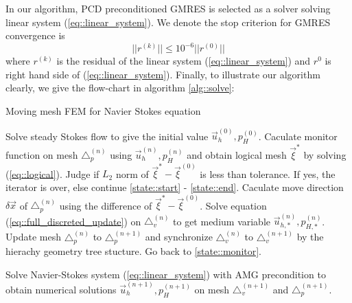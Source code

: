 \documentclass{eajam}
\begin{document}
   In our algorithm, PCD preconditioned GMRES is selected as a solver
   solving linear system (\ref{eq::linear_system}). We denote the stop
   criterion for GMRES convergence is 
   \begin{equation}
     ||r^{(k)}||  \leq 10^{-6} ||r^{(0)}||
   \end{equation}
   where $r^{(k)}$ is the residual of the linear system
   (\ref{eq::linear_system}) and $r^{0}$ is right hand side of
   (\ref{eq::linear_system}). Finally, to illustrate our algorithm
   clearly, we give the flow-chart in algorithm \ref{alg::solve}:
   \begin{algorithm}
     \caption{Moving mesh FEM for Navier Stokes equation}
     \begin{algorithmic}[1]
       \State Solve steady Stokes flow to give the initial
       value $\vec{u}_h^{(0)}, p_H^{(0)}$.
       \State Caculate monitor function on mesh $\triangle_p^{(n)}$
       using $\vec{u}_h^{(n)}, p_H^{(n)}$ and obtain
       logical mesh $\vec{\xi}^*$ by solving
       (\ref{eq::logical}). \label{state::monitor}
       \State Judge if $L_2$ norm of $\vec{\xi}^* -
       \vec{\xi}^{(0)}$ is less than tolerance. If yes,
       the iterator is over, else continue
       \ref{state::start} - \ref{state::end}.
       \State Caculate move direction $\delta \vec{x}$ of
       $\triangle_p^{(n)}$ using the difference of
       $\vec{\xi}^* - \vec{\xi}^{(0)}$. 
       \label{state::start}
       \State Solve equation (\ref{eq::full_discreted_update}) on
       $\triangle_v^{(n)}$ to get medium variable 
       $\vec{u}_{h, *}^{(n)}, p_{H, *}^{(n)}$.
       \State Update mesh $\triangle_p^{(n)}$ to $\triangle_p^{(n +
         1)}$ and synchronize $\triangle_v^{(n)}$ to
       $\triangle_v^{(n + 1)}$ by the hierachy geometry tree
       stucture.
       \State Go back to \ref{state::monitor}. \label{state::end}       
       
       \State Solve Navier-Stokes system
       (\ref{eq::linear_system}) with AMG precondition to obtain numerical
       solutions $\vec{u}_h^{(n + 1)}, p_H^{(n + 1)}$ on
       mesh $\triangle_v^{(n + 1)}$ and $\triangle_p^{(n
         + 1)}$.
       \EndWhile     
     \end{algorithmic}
     \label{alg::solve}
   \end{algorithm}

 
\end{document}
